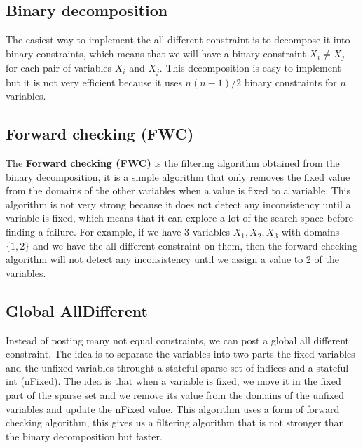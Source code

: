 \documentclass[12pt, openany]{report}
\theoremstyle{definition}
\begin{document}
\subsection{Binary decomposition}
The easiest way to implement the all different constraint is to decompose it into binary constraints, which means that we will have a binary constraint $X_i \neq X_j$ for each pair of variables $X_i$ and $X_j$. This decomposition is easy to implement but it is not very efficient because it uses $n(n-1)/2$ binary constraints for $n$ variables.\\
\subsection{Forward checking (FWC)}
The \textbf{Forward checking (FWC)} is the filtering algorithm obtained from the binary decomposition, it is a simple algorithm that only removes the fixed value from the domains of the other variables when a value is fixed to a variable. This algorithm is not very strong because it does not detect any inconsistency until a variable is fixed, which means that it can explore a lot of the search space before finding a failure. For example, if we have 3 variables $X_1, X_2, X_3$ with domains $\{1,2\}$ and we have the all different constraint on them, then the forward checking algorithm will not detect any inconsistency until we assign a value to 2 of the variables. 
\subsection{Global AllDifferent}
Instead of posting many not equal constraints, we can post a global all different constraint. The idea is to separate the variables into two parts the fixed variables and the unfixed variables throught a stateful sparse set of indices and a stateful int (nFixed). The idea is that when a variable is fixed, we move it in the fixed part of the sparse set and we remove its value from the domains of the unfixed variables and update the nFixed value. This algorithm uses a form of forward checking algorithm, this gives us a filtering algorithm that is not stronger than the binary decomposition but faster.
\end{document}
